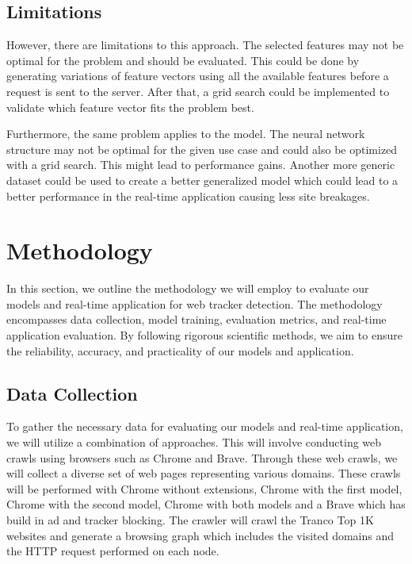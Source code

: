 \subsection{Limitations}

However, there are limitations to this approach. The selected features may not be optimal for the problem and should be evaluated.
This could be done by generating variations of feature vectors using all the available features before a request is sent to the server.
After that, a grid search could be implemented to validate which feature vector fits the problem best. 

Furthermore, the same problem applies to the model. The neural network structure may not be optimal for the given use case and could also
be optimized with a grid search. This might lead to performance gains. Another more generic dataset could be used to create a better generalized
model which could lead to a better performance in the real-time application causing less site breakages.

\section{Methodology}

In this section, we outline the methodology we will employ to evaluate our models and real-time application for web tracker detection.
The methodology encompasses data collection, model training, evaluation metrics, and real-time application evaluation. By following
rigorous scientific methods, we aim to ensure the reliability, accuracy, and practicality of our models and application.

\subsection{Data Collection}
To gather the necessary data for evaluating our models and real-time application, we will utilize a combination of approaches.
This will involve conducting web crawls using browsers such as Chrome and Brave. Through these web crawls,
we will collect a diverse set of web pages representing various domains. These crawls will be performed with Chrome without extensions,
Chrome with the first model, Chrome with the second model, Chrome with both models and a Brave which has build in ad and tracker blocking.
The crawler will crawl the Tranco Top 1K websites and generate a browsing graph which includes the visited domains and the HTTP request
performed on each node.

